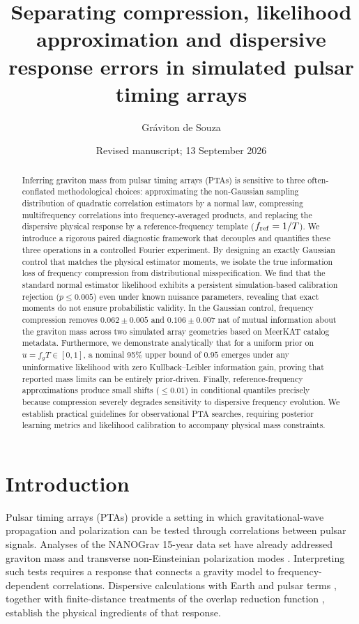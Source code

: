 \documentclass[11pt,a4paper]{article}
\title{Separating compression, likelihood approximation and dispersive response errors in simulated pulsar timing arrays}
\author{Gráviton de Souza}
\date{Revised manuscript; 13 September 2026}
\begin{document}
\maketitle
\begin{abstract}
Inferring graviton mass from pulsar timing arrays (PTAs) is sensitive to three often-conflated methodological choices: approximating the non-Gaussian sampling distribution of quadratic correlation estimators by a normal law, compressing multifrequency correlations into frequency-averaged products, and replacing the dispersive physical response by a reference-frequency template ($f_{\rm ref} = 1/T$). We introduce a rigorous paired diagnostic framework that decouples and quantifies these three operations in a controlled Fourier experiment. By designing an exactly Gaussian control that matches the physical estimator moments, we isolate the true information loss of frequency compression from distributional misspecification. We find that the standard normal estimator likelihood exhibits a persistent simulation-based calibration rejection ($p \le 0.005$) even under known nuisance parameters, revealing that exact moments do not ensure probabilistic validity. In the Gaussian control, frequency compression removes $0.062 \pm 0.005$ and $0.106 \pm 0.007$ nat of mutual information about the graviton mass across two simulated array geometries based on MeerKAT catalog metadata. Furthermore, we demonstrate analytically that for a uniform prior on $u = f_g T \in [0,1]$, a nominal 95\% upper bound of $0.95$ emerges under any uninformative likelihood with zero Kullback--Leibler information gain, proving that reported mass limits can be entirely prior-driven. Finally, reference-frequency approximations produce small shifts ($\le 0.01$) in conditional quantiles precisely because compression severely degrades sensitivity to dispersive frequency evolution. We establish practical guidelines for observational PTA searches, requiring posterior learning metrics and likelihood calibration to accompany physical mass constraints.
\end{abstract}

\section{Introduction}
Pulsar timing arrays (PTAs) provide a setting in which gravitational-wave propagation and polarization can be tested through correlations between pulsar signals. Analyses of the NANOGrav 15-year data set have already addressed graviton mass and transverse non-Einsteinian polarization modes \cite{wu2024,nanograv2024}. Interpreting such tests requires a response that connects a gravity model to frequency-dependent correlations. Dispersive calculations with Earth and pulsar terms \cite{liang2021}, together with finite-distance treatments of the overlap reduction function \cite{cordes2025}, establish the physical ingredients of that response.
\end{document}
